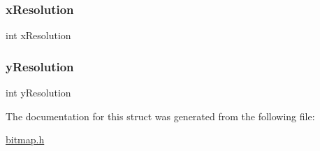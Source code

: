 \subsubsection{\texorpdfstring{x\+Resolution}{xResolution}}
{\footnotesize\ttfamily int x\+Resolution}

\mbox{\label{struct_bitmap_info_header_aa2f350dd0bda750656d5db5f5e37b2b3}} 
\subsubsection{\texorpdfstring{y\+Resolution}{yResolution}}
{\footnotesize\ttfamily int y\+Resolution}



The documentation for this struct was generated from the following file\+:\begin{DoxyCompactItemize}
\item 
\hyperlink{bitmap_8h}{bitmap.\+h}\end{DoxyCompactItemize}
